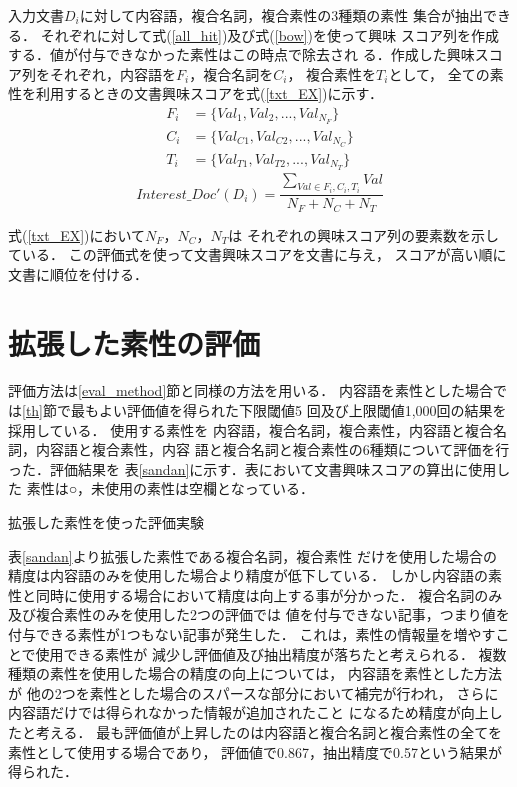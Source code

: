 \documentclass[japanese]{jnlp_1.4}
\newcounter{ex}
\begin{document}
入力文書$D_i$に対して内容語，複合名詞，複合素性の3種類の素性
集合が抽出できる．
それぞれに対して式(\ref{all_hit})及び式(\ref{bow})を使って興味
スコア列を作成する．値が付与できなかった素性はこの時点で除去され
る．作成した興味スコア列をそれぞれ，内容語を$F_i$，複合名詞を$C_i$，
複合素性を$T_i$として，
全ての素性を利用するときの文書興味スコアを式(\ref{txt_EX})に示す．
\begin{align} \label{txt_F}
 F_i & =\{Val_{1},Val_{2},...,Val_{N_F}\} \\
 C_i & =\{Val_{C1},Val_{C2},...,Val_{N_C}\} \\
 T_i & =\{Val_{T1},Val_{T2},...,Val_{N_T}\} 
\end{align}
\begin{equation}
 Interest\_Doc'(D_i) =  \frac{
	\sum_{Val \in F_i,C_i,T_i} Val}{ N_F + N_C + N_T}   
\label{txt_EX}
\end{equation}

式(\ref{txt_EX})において$N_F$，$N_C$，$N_T$は
それぞれの興味スコア列の要素数を示している．
この評価式を使って文書興味スコアを文書に与え，
スコアが高い順に文書に順位を付ける．



\section{拡張した素性の評価}\label{sec_evalexp2}

評価方法は\ref{eval_method}節と同様の方法を用いる．
内容語を素性とした場合では\ref{th}節で最もよい評価値を得られた下限閾値5
回及び上限閾値1,000回の結果を採用している．
使用する素性を
内容語，複合名詞，複合素性，内容語と複合名詞，内容語と複合素性，内容
語と複合名詞と複合素性の6種類について評価を行った．評価結果を
表\ref{sandan}に示す．表において文書興味スコアの算出に使用した
素性は○，未使用の素性は空欄となっている．

\begin{table}[b]
\caption{拡張した素性を使った評価実験}

\label{sandan}
\end{table}

表\ref{sandan}より拡張した素性である複合名詞，複合素性
だけを使用した場合の
精度は内容語のみを使用した場合より精度が低下している．
しかし内容語の素性と同時に使用する場合において精度は向上する事が分かった．
複合名詞のみ及び複合素性のみを使用した2つの評価では
値を付与できない記事，つまり値を付与できる素性が1つもない記事が発生した．
これは，素性の情報量を増やすことで使用できる素性が
減少し評価値及び抽出精度が落ちたと考えられる．
複数種類の素性を使用した場合の精度の向上については，
内容語を素性とした方法が
他の2つを素性とした場合のスパースな部分において補完が行われ，
さらに内容語だけでは得られなかった情報が追加されたこと
になるため精度が向上したと考える．
最も評価値が上昇したのは内容語と複合名詞と複合素性の全てを
素性として使用する場合であり，
評価値で0.867，抽出精度で0.57という結果が得られた．
\end{document}
